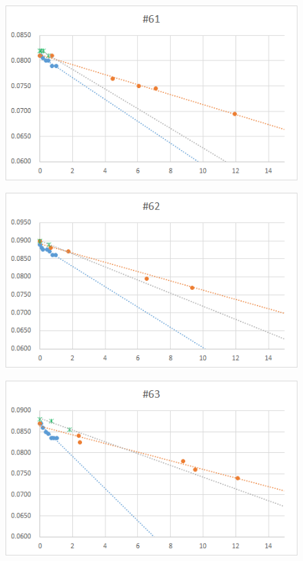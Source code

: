   \begin{figure}[htbp]
    \centering
       \includegraphics[width=120mm]{vol_061.png}
  \end{figure}
  \begin{figure}[htbp]
    \centering
       \includegraphics[width=120mm]{vol_062.png}
  \end{figure}
  \begin{figure}[htbp]
    \centering
       \includegraphics[width=120mm]{vol_063.png}
  \end{figure}
